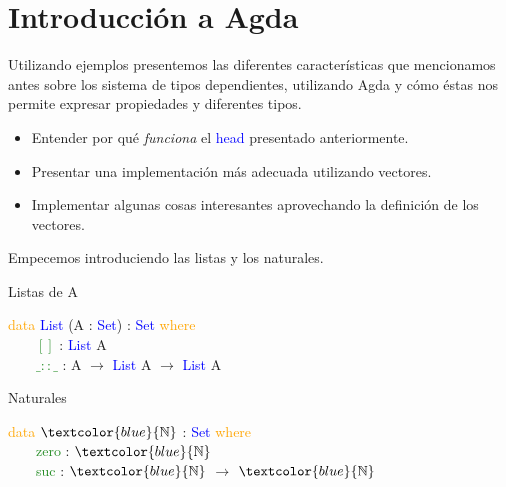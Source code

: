 \documentclass[xcolor=dvipsnames]{beamer} %
\newcommand{\cf}[1]{\textcolor{blue}{#1}}
\newcommand{\ct}[1]{\textcolor{blue}{#1}}
\newcommand{\cc}[1]{\textcolor{ForestGreen}{#1}}
\newcommand{\ck}[1]{\textcolor{orange}{#1}}
\newcommand{\N}{\ct{\mathbb{N}}}
\newcommand{\ra}{\rightarrow}
\newcommand{\T}{ \ \ \ \ }
\begin{document}
\section{Introducción a Agda}
 
\begin{frame}

\begin{block}{}
Utilizando ejemplos presentemos las diferentes características que
mencionamos antes sobre los sistema de tipos dependientes, utilizando
Agda y cómo éstas nos permite expresar propiedades y diferentes tipos.
\end{block}

\pause

\begin{block}{}
\begin{itemize}

\item Entender por qué \textit{funciona} el \cf{head} presentado anteriormente.\\
\item Presentar una implementación más adecuada utilizando vectores.\\
\item Implementar algunas cosas interesantes aprovechando la definición de los
vectores.
\end{itemize}
\end{block}

\end{frame}

\begin{frame}

\begin{block}{}
Empecemos introduciendo las listas y los naturales.
\end{block}

\pause

\begin{block}{Listas de A}

\ck{data} \ct{List} (A : \ct{Set}) : \ct{Set} \ck{where}\\
\T \cc{$[]$} : \ct{List} A\\
\T \cc{$\_::\_$} : A $\ra$ \ct{List} A $\ra$ \ct{List} A

\end{block}

\pause

\begin{block}{Naturales}

\ck{data} $\N$ : \ct{Set} \ck{where}\\
\T \cc{zero} : $\N$\\
\T \cc{suc}  : $\N$ $\ra$ $\N$

\end{block}

\end{frame}
\end{document}
